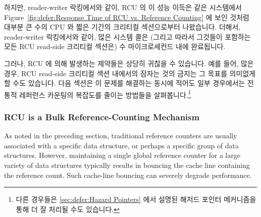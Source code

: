 하지만, reader-writer 락킹에서와 같이, RCU 의 이 성능 이득은 같은 시스템에서
Figure~\ref{fig:defer:Response Time of RCU vs. Reference Counting}
에 보인 것처럼 대부분 큰 수의 CPU 와 짧은 기간의 크리티컬 섹션으로부터
나왔습니다.
더해서, reader-writer 락킹에서와 같이, 많은 시스템 콜은 (그리고 따라서 그것들이
포함하는 모든 RCU read-side 크리티컬 섹션은) 수 마이크로세컨드 내에 완료됩니다.

그러나, RCU 에 의해 발생하는 제약들은 상당히 귀찮을 수 있습니다.
예를 들어, 많은 경우, RCU read-side 크리티컬 섹션 내에서의 잠자는 것의 금지는
그 목표를 의미없게 할 수도 있습니다.
다음 섹션은 이 문제를 해결하는 동시에 적어도 일부 경우에서는 전통적 레퍼런스
카운팅의 복잡도를 줄이는 방법들을 살펴봅니다.\footnote{
	다른 경우들은 \cref{sec:defer:Hazard Pointers} 에서 설명된 해저드
	포인터 메커니즘을 통해 더 잘 처리될 수도 있습니다.}

\subsubsection{RCU is a Bulk Reference-Counting Mechanism}
\label{sec:defer:RCU is a Bulk Reference-Counting Mechanism}

As noted in the preceding section,
traditional reference counters are usually associated with a specific
data structure, or perhaps a specific group of data structures.
However, maintaining a single global reference counter for a large
variety of data structures typically results in bouncing
the cache line containing the reference count.
Such cache-line bouncing can severely degrade performance.


